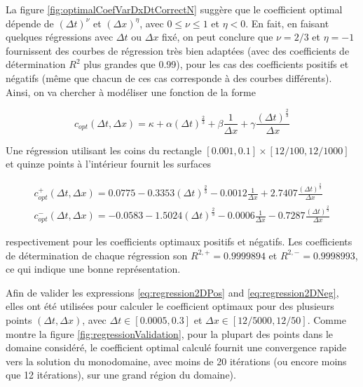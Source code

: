 \indent La figure \ref{fig:optimalCoefVarDxDtCorrectN} suggère que le coefficient optimal dépende de $(\Delta t)^\nu$ et $(\Delta x)^\eta$, avec $0 \leq \nu \leq 1$ et $\eta < 0$. En fait, en faisant quelques régressions avec $\Delta t $ ou $\Delta x$ fixé, on peut conclure que $\nu = 2/3$ et $\eta = -1$ fournissent des courbes de régression très bien adaptées (avec des coefficients de détermination $R^2$ plus grandes que 0.99), pour les cas des coefficients positifs et négatifs (même que chacun de ces cas corresponde à des courbes différents). Ainsi, on va chercher à modéliser une fonction de la forme

\begin{equation}
	\label{eq:regression2D}
	c_{opt}(\Delta t, \Delta x) = \kappa + \alpha (\Delta t)^{\frac{2}{3}} + \beta \frac{1}{\Delta x} + \gamma   \frac{(\Delta t)^{\frac{2}{3}}}{\Delta x}
\end{equation}

\indent Une régression utilisant les coins du rectangle $[0.001,0.1]\times[12/100,12/1000]$ et quinze points à l'intérieur fournit les surfaces 

\begin{gather}
	c_{opt}^+(\Delta t, \Delta x) = 0.0775 -0.3353 (\Delta t)^{\frac{2}{3}} - 0.0012 \frac{1}{\Delta x} + 2.7407   \frac{(\Delta t)^{\frac{2}{3}}}{\Delta x} 	\label{eq:regression2DPos} \\
	c_{opt}^-(\Delta t, \Delta x) = -0.0583 -1.5024 (\Delta t)^{\frac{2}{3}} - 0.0006 \frac{1}{\Delta x} -0.7287  \frac{(\Delta t)^{\frac{2}{3}}}{\Delta x} 	\label{eq:regression2DNeg}
\end{gather}

\noindent respectivement pour les coefficients optimaux positifs et négatifs. Les coefficients de détermination de chaque régression son $R^{2,+} = 0.9999894$ et $R^{2,-} = 0.9998993$, ce qui indique une bonne représentation.

\indent Afin de valider les expressions \eqref{eq:regression2DPos} and \eqref{eq:regression2DNeg}, elles ont été utilisées pour calculer le coefficient optimaux pour des plusieurs points $(\Delta t, \Delta x)$, avec $\Delta t \in [0.0005,0.3]$ et $\Delta x \in \left[12/5000,12/50 \right]$. Comme montre la figure \ref{fig:regressionValidation}, pour la plupart des points dans le domaine considéré, le coefficient optimal calculé fournit une convergence rapide vers la solution du monodomaine, avec moins de 20 itérations (ou encore moins que 12 itérations), sur une grand région du domaine).

